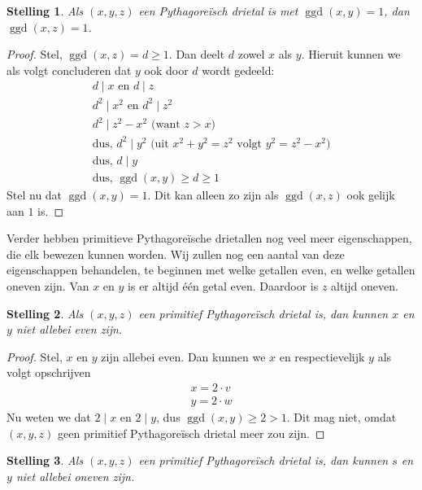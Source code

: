 \documentclass[12pt,reqno]{article}
\theoremstyle{theorem}
\newtheorem{theorem}{Stelling}
\theoremstyle{definition}
\DeclareMathOperator{\ggd}{ggd}
\begin{document}
	\begin{theorem}
		Als $(x,y,z)$ een Pythagore\"isch drietal is met $\ggd(x,y) = 1$, dan $\ggd(x,z) = 1$.
	\end{theorem}
	\begin{proof}
		Stel, $\ggd(x,z) = d \geq 1$. Dan deelt $d$ zowel $x$ als $y$. Hieruit kunnen we als volgt concluderen dat $y$ ook door $d$ wordt gedeeld:
		\begin{align*}
			d\mid x \text{ en } d\mid z \\
			d^2\mid x^2 \text{ en } d^2 \mid z^2 \\
			d^2\mid z^2 - x^2 \text{ (want } z>x \text{)} \\
			\text{dus, } d^2 \mid y^2 \text{ (uit $x^2 + y^2 = z^2$ volgt $y^2 = z^2 - x^2$)} \\
			\text{dus, } d \mid y \\
			\text{dus, } \ggd(x, y) \geq d \geq 1
		\end{align*}
		Stel nu dat $\ggd(x, y) = 1$. Dit kan alleen zo zijn als $\ggd(x, z) $ ook gelijk aan $1$ is. 
	\end{proof}	
	Verder hebben primitieve Pythagore\"ische drietallen nog veel meer eigenschappen, die elk bewezen kunnen worden. Wij zullen nog een aantal van deze eigenschappen behandelen, te beginnen met welke getallen even, en welke getallen oneven zijn. Van $x$ en $y$ is er altijd \'e\'en getal even. Daardoor is $z$ altijd oneven.
	\begin{theorem}
		Als $(x, y, z)$ een primitief Pythagore\"isch drietal is, dan kunnen $x$ en $y$ niet allebei even zijn.
	\end{theorem}
	\begin{proof}
		Stel, $x$ en $y$ zijn allebei even. Dan kunnen we $x$ en respectievelijk $y$ als volgt opschrijven
		\begin{align*}
		x = 2\cdot v \\
		y = 2\cdot w
		\end{align*} 
		Nu weten we dat $2\mid x$ en $2 \mid y$, dus $\ggd(x, y) \geq 2 > 1$. Dit mag niet, omdat $(x, y, z)$ geen primitief Pythagore\"isch drietal meer zou zijn.
	\end{proof}
	\begin{theorem}
		Als $(x, y, z)$ een primitief Pythagore\"isch drietal is, dan kunnen $s$ en $y$ niet allebei oneven zijn.
	\end{theorem}
\end{document}
